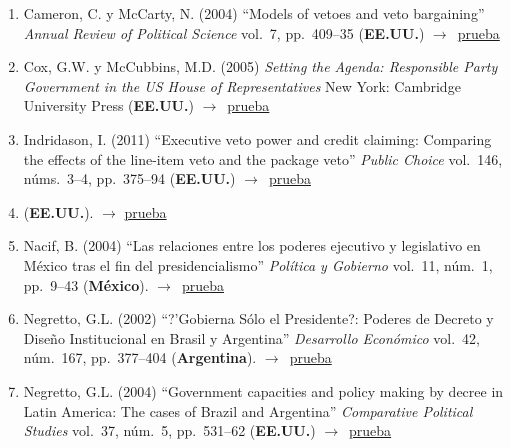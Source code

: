 \documentclass[12 pt, letter]{article}
\newenvironment{CitasMiTrabajo}{
    \begin{footnotesize}
    \begin{enumerate}[label={\footnotesize\emph{cita~\arabic*}},ref=\arabic*] %
        \setlength{\itemsep}{.1\itemsep}
        \setlength{\parskip}{.1\parskip}
    }{\end{enumerate}\end{footnotesize}}
\begin{document}
        \begin{CitasMiTrabajo}

        \item Cameron, C. y McCarty, N. (2004) ``Models of vetoes and veto
        bargaining'' \emph{Annual Review of Political Science} vol.\ 7, pp.\ 409--35
        (\textbf{EE.UU.}) $\rightarrow$~\href{https://github.com/emagar/cv/blob/master/citasMiTrab/BullyPulpits/cammc.pdf}{prueba}

        \item Cox, G.W. y McCubbins, M.D. (2005)
        \emph{Setting the Agenda: Responsible Party Government in the US House of Representatives} New
        York: Cambridge University Press (\textbf{EE.UU.}) $\rightarrow$~\href{https://github.com/emagar/cv/blob/master/citasMiTrab/BullyPulpits/coxmcS.pdf}{prueba}

        \item Indridason, I. (2011) ``Executive veto power and credit claiming: Comparing the effects of the line-item veto and the package veto''
            \emph{Public Choice} vol.\ 146, n\'ums.\ 3--4, pp.~375--94 (\textbf{EE.UU.}) $\rightarrow$~\href{https://github.com/emagar/cv/blob/master/citasMiTrab/BullyPulpits/indridasson2011pubcho.pdf}{prueba}

        \item {} (\textbf{EE.UU.}). $\rightarrow$ \href{https://github.com/emagar/cv/blob/master/citasMiTrab/BullyPulpits/mejia.pdf}{prueba}

        \item Nacif, B. (2004) ``Las relaciones entre los poderes ejecutivo y
        legislativo en M\'exico tras el fin del presidencialismo''
        \emph{Pol\'itica y Gobierno} vol.\ 11, n\'um.\ 1, pp.\ 9--43  (\textbf{M\'exico}). $\rightarrow$~\href{https://github.com/emagar/cv/blob/master/citasMiTrab/BullyPulpits/Benito_Nacif_p-9-42.pdf}{prueba}

        \item Negretto, G.L. (2002) ``?'Gobierna S\'olo el Presidente?: Poderes de Decreto y Dise\~no Institucional en Brasil y Argentina'' \emph{Desarrollo Econ\'omico} vol.\ 42, n\'um.\ 167, pp.\ 377--404  (\textbf{Argentina}). $\rightarrow$~\href{https://github.com/emagar/cv/blob/master/citasMiTrab/BullyPulpits/negretto.pdf}{prueba}

        \item Negretto, G.L. (2004) ``Government capacities and
        policy making by decree in Latin America: The cases of Brazil and
        Argentina'' \emph{Comparative Political Studies} vol.\ 37, n\'um.\ 5, pp.\ 531--62
        (\textbf{EE.UU.}) $\rightarrow$~\href{https://github.com/emagar/cv/blob/master/citasMiTrab/BullyPulpits/neg2.pdf}{prueba}


\end{CitasMiTrabajo}
\end{document}
